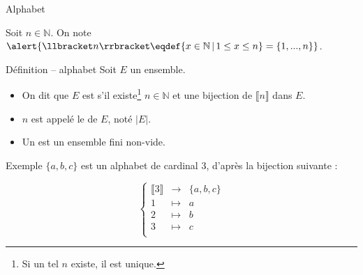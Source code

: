 
\begingroup

\begin{frame}{Alphabet}
  
  Soit $n\in \mathbb{N}$. On note $\alert{\llbracket n\rrbracket \eqdef \{x\in \mathbb{N} \,|\, 1 \le x \le n\} = \{1, ..., n\}}$.
  
  \begin{block}{Définition -- alphabet}
    Soit $E$ un ensemble.
    \begin{itemize}
    \item On dit que $E$ est  s'il existe\footnote{Si un tel $n$ existe, il est unique.} $n\in \mathbb{N}$ et une bijection de $\llbracket n\rrbracket$ dans $E$. 
    \item $n$ est appelé le  de $E$, noté \alert{$|E|$}.
    \item Un  est un \alert{ensemble fini non-vide}. 
    \end{itemize}
  \end{block}

  \begin{exampleblock}{Exemple}
    $\{a, b, c\}$ est un alphabet de cardinal 3, d'après la bijection suivante :

    $$
    \left\{\begin{array}{ccl}
    \llbracket 3\rrbracket &\rightarrow& \{a, b, c\}\\
    1 &\mapsto& a\\ 
    2 &\mapsto& b\\ 
    3 &\mapsto& c\\ 
    \end{array}\right.
    $$
  \end{exampleblock}

\end{frame}

\endgroup

